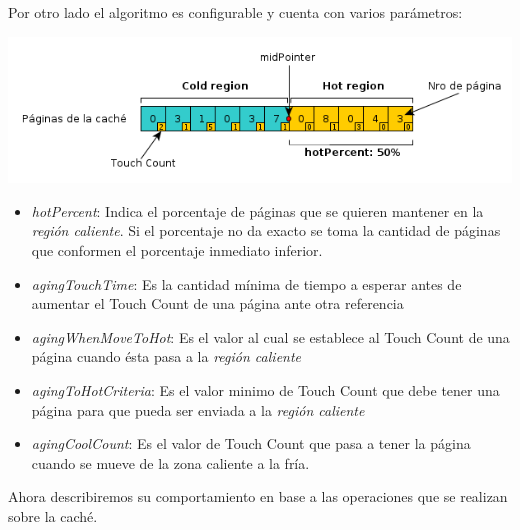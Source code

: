 \documentclass[11pt, a4paper, spanish]{article}
\begin{document}
Por otro lado el algoritmo es configurable y cuenta con varios par\'ametros:

\begin{center}
	\includegraphics[scale=0.65]{diagramas/TouchCountAlgorithm1.png}\\
\end{center}

\begin{itemize}
	\item{\emph{hotPercent}: Indica el porcentaje de p\'aginas que se quieren mantener en la \textit{regi\'on caliente}. Si el porcentaje no
da exacto se toma la cantidad de p\'aginas que conformen el porcentaje inmediato inferior. }
	\item{\emph{agingTouchTime}: Es la cantidad m\'inima de tiempo a esperar antes de aumentar el Touch Count de una p\'agina ante otra referencia}
	\item{\emph{agingWhenMoveToHot}: Es el valor al cual se establece al Touch Count de una p\'agina cuando \'esta pasa a la \textit{regi\'on caliente} }
	\item{\emph{agingToHotCriteria}: Es el valor minimo de Touch Count que debe tener una p\'agina para que pueda ser enviada a la \textit{regi\'on caliente}}
	\item{\emph{agingCoolCount}: Es el valor de Touch Count que pasa a tener la p\'agina cuando se mueve de la zona caliente a la fr\'ia.}
\end{itemize}

Ahora describiremos su comportamiento en base a las operaciones que se realizan sobre la cach\'e.
\end{document}
